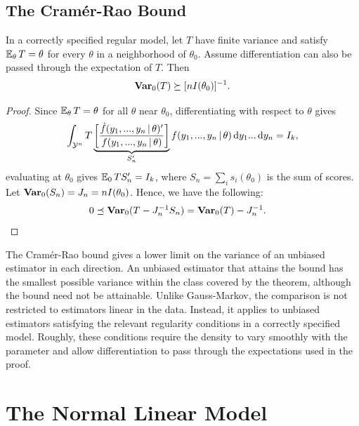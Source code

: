 \documentclass[a4paper,12pt]{article}
\begin{document}
\subsection{The Cram\'er-Rao Bound}

\begin{theorem}\label{thm-cramer-rao}
	In a correctly specified regular model,
	let $T$ have finite variance and satisfy $\operatorname{\mathbb{E}}_\theta T=\theta$
	for every $\theta$ in a neighborhood of $\theta_0$.
	Assume differentiation can also be passed through the expectation of $T$.
	Then
	\begin{align}
		\operatorname{\text{\textrm{\upshape\textbf{Var}}}}_0(T)\succeq[nI(\theta_0)]^{-1}.
	\end{align}
\end{theorem}
\begin{proof}
	Since $\operatorname{\mathbb{E}}_\theta T=\theta$ for all $\theta$ near $\theta_0$,
	differentiating with respect to $\theta$ gives
	\begin{gather}\label{eq-cramer-rao-derivative}
		\int_{\mathcal{Y}^n} T
		\underbrace{\left[\frac{\dot f(y_1,...,y_n\mathpunct{}|\mathpunct{}\theta)^{\prime}}{f(y_1,...,y_n\mathpunct{}|\mathpunct{}\theta)}\right]}_{S_n^{\prime}}
		f(y_1,...,y_n\mathpunct{}|\mathpunct{}\theta) \mathop{}\!{\mathrm{d}} y_1...\mathop{}\!{\mathrm{d}} y_n = I_k,
	\end{gather}
	evaluating at $\theta_0$ gives $\operatorname{\mathbb{E}}_0 T S_n^{\prime} = I_k$,
	where $S_n=\sum_i s_i(\theta_0)$ is the sum of scores.
	Let $\operatorname{\text{\textrm{\upshape\textbf{Var}}}}_0(S_n)=J_n=nI(\theta_0)$.
	Hence, we have the following:
	\begin{align*}
		0
		&\preceq \operatorname{\text{\textrm{\upshape\textbf{Var}}}}_0(T-J_n^{-1} S_n)
		= \operatorname{\text{\textrm{\upshape\textbf{Var}}}}_0(T)-J_n^{-1}.
		\qedhere
	\end{align*}
\end{proof}

\begin{remark}
	The Cram\'er-Rao bound gives a lower limit on the variance of an unbiased estimator
	in each direction. An unbiased estimator that attains the bound has the smallest possible
	variance within the class covered by the theorem, although the bound need not be attainable.
	Unlike Gauss-Markov, the comparison is not restricted to estimators linear in the data.
	Instead, it applies to unbiased estimators satisfying the relevant regularity conditions
	in a correctly specified model.
	Roughly, these conditions require the density to vary smoothly with the parameter
	and allow differentiation to pass through the expectations used in the proof.
\end{remark}

\section{The Normal Linear Model}
\end{document}

